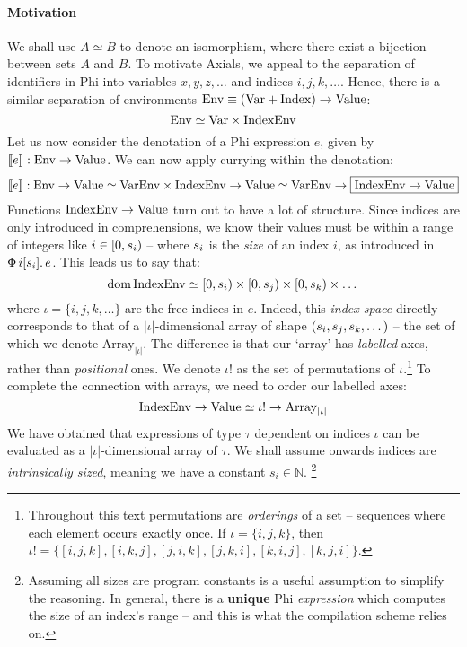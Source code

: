 \paragraph{Motivation}
We shall use $A \simeq B$ to denote an isomorphism, where there exist a bijection between sets $A$ and $B$. To motivate Axials, we appeal to the separation of identifiers in Phi into variables $x, y, z, \dots$ and indices $i, j, k, \dots$. Hence, there is a similar separation of environments $\mathrm{Env} \equiv (\mathrm{Var} + \mathrm{Index}) \to \mathrm{Value}$:
$$ \mathrm{Env} \simeq \mathrm{Var} \times \mathrm{IndexEnv} $$
Let us now consider the denotation of a Phi expression $e$, given by $\llbracket e \rrbracket : \mathrm{Env} \to \mathrm{Value}$. We can now apply currying within the denotation:
$$\llbracket e \rrbracket : \mathrm{Env} \to \mathrm{Value} \simeq \mathrm{VarEnv} \times \mathrm{IndexEnv} \to \mathrm{Value} \simeq \mathrm{VarEnv} \to \boxed{\mathrm{IndexEnv} \to \mathrm{Value}}$$
Functions $\mathrm{IndexEnv} \to \mathrm{Value}$ turn out to have a lot of structure.
Since indices are only introduced in  comprehensions, we know their values must be within a range of integers like $i \in \left[ 0, \sizeat i \right)$
-- where $s_{i}$ is the \textit{size} of an index $i$, as introduced in $\Phi\, {i}[{s_{i}}] \ldotp {e}$. 
This leads us to say that:
$$ \mathrm{dom}\,\denotenvindex \simeq \left[0, \sizeat i \right) \times \left[0, \sizeat j \right) \times \left[0, \sizeat k \right) \times \dots $$ 
where $\iota = \{i, j, k, \dots \}$ are the free indices in $e$.%
\newcommand{\denotarrayiota}{\mathrm{Array}_{|\iota|}}
Indeed, this \textit{index space} directly corresponds to that of a $|\iota|$-dimensional array of shape $(s_{i}, s_{j}, s_{k}, \dots)$ -- the set of which we denote $\denotarrayiota$. 
The difference is that our `array' has \textit{labelled} axes, rather than \textit{positional} ones.
We denote $\iota!$ as the set of permutations of $\iota$.\footnote{Throughout this text permutations are \textit{orderings} of a set -- sequences where each element occurs exactly once. If $\iota = \{i, j, k\}$, then $\iota! = \{[i, j, k], [i, k, j], [j, i, k], [j, k, i], [k, i, j], [k, j, i]\}$.}
To complete the connection with arrays, we need to order our labelled axes:
$$ \denotenvindex \to \denotvalue \simeq \iota! \to \denotarrayiota $$
We have obtained that expressions of type $\tau$ dependent on indices $\iota$ can be evaluated as a $|\iota|$-dimensional array of $\tau$. We shall assume onwards indices are \textit{intrinsically sized}, meaning we have a constant $s_i \in \mathbb N$.%
\footnote{Assuming all sizes are program constants is a useful assumption to simplify the reasoning. In general, there is a \textbf{unique} Phi \textit{expression} which computes the size of an index's range -- and this is what the compilation scheme relies on.}


